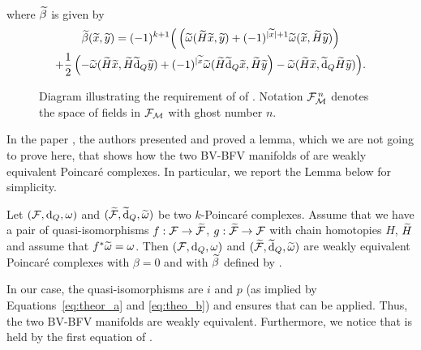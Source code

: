 \begin{theorem}
\begin{enumerate}[label={\textup{\alph*)}}]
\begin{align}
        \end{align}
        where $\widetilde{\beta}$ is given by
        \begin{multline}
        \label{eq:beta}
            \widetilde{\beta}(\widetilde{x}, \widetilde{y}) = (-1)^{k+1} \Big( \left(
            \widetilde{\omega} (\widetilde{H} \widetilde{x}, \widetilde{y}) + 
            (-1)^{|\widetilde{x}|+1} \widetilde{\omega} (\widetilde{x}, \widetilde{H} \widetilde{y}) \right) \\
            + \frac{1}{2}\left(-\widetilde{\omega}(\widetilde{H} \widetilde{x}, \widetilde{H} \widetilde{\dd}_Q \widetilde{y}) + 
            (-1)^{|\widetilde{x}} \widetilde{\omega}(\widetilde{H}\widetilde{\dd}_Q \widetilde{x}, \widetilde{H} \widetilde{y} \right) - 
            \widetilde{\omega}(\widetilde{H}\widetilde{x}, \widetilde{\dd}_Q \widetilde{H} \widetilde{y})\Big).
        \end{multline}
    \end{enumerate}
\end{theorem}

\begin{figure}
    \centering
    
    \caption{Diagram illustrating the requirement of  of . Notation $\mathcal{F}_{\mathcal{M}}^{\,n}$ denotes the space of fields in $\mathcal{F}_{\mathcal{M}}$ with ghost number $n$.}
    \label{fig:chain_map_theorem}
\end{figure}

In the paper \cite{Gluing_BV-BFV}, the authors presented and proved a lemma, which we are not going to prove here, that shows how the two BV-BFV manifolds of  are weakly equivalent Poincaré complexes.
In particular, we report the Lemma below for simplicity.

\begin{lemma}
\label{lemma:Poicare}
    Let $(\mathcal{F}, \dd_Q, \omega)$ and $(\widetilde{\mathcal{F}}, \widetilde{\dd}_Q, \widetilde{\omega})$ be two $k$-Poincaré complexes.
    Assume that we have a pair of quasi-isomorphisms $f:\mathcal{F} \rightarrow \widetilde{\mathcal{F}}$, $g:\widetilde{\mathcal{F}} \rightarrow \mathcal{F}$ with chain homotopies $H$, $\widetilde{H}$ and assume that $f^* \widetilde{\omega} = \omega$.
    Then $(\mathcal{F}, \dd_Q, \omega)$ and $(\widetilde{\mathcal{F}}, \widetilde{\dd}_Q, \widetilde{\omega})$ are weakly equivalent Poincaré complexes with $\beta = 0$ and with $\widetilde{\beta}$ defined by .
\end{lemma}

In our case, the quasi-isomorphisms are $i$ and $p$ (as implied by Equations~\ref{eq:theor_a} and \ref{eq:theo_b}) and  ensures that  can be applied.
Thus, the two BV-BFV manifolds are weakly equivalent.
Furthermore, we notice that  is held by the first equation of .

